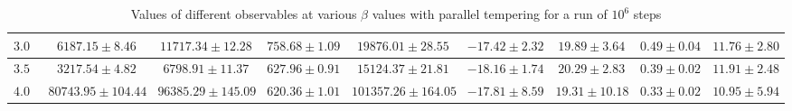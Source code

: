 \begin{sidewaystable}[t!]
\begin{tabular}{|c|c|c|c|c|c|c|c|c|}
            \hline
            $3.00$ & $6187.15 \pm 8.46$ & $11717.34 \pm 12.28$ & $758.68 \pm 1.09$ & $19876.01 \pm 28.55$ & $-17.42 \pm 2.32$ & $19.89 \pm 3.64$ & $0.49 \pm 0.04$ & $11.76 \pm 2.80$ \\
            \hline
            $3.50$ & $3217.54 \pm 4.82$ & $6798.91 \pm 11.37$ & $627.96 \pm 0.91$ & $15124.37 \pm 21.81$ & $-18.16 \pm 1.74$ & $20.29 \pm 2.83$ & $0.39 \pm 0.02$ & $11.91 \pm 2.48$ \\
            \hline
            $4.00$ & $80743.95 \pm 104.44$ & $96385.29 \pm 145.09$ & $620.36 \pm 1.01$ & $101357.26 \pm 164.05$ & $-17.81 \pm 8.59$ & $19.31 \pm 10.18$ & $0.33 \pm 0.02$ & $10.95 \pm 5.94$ \\            
        \end{tabular}
            \caption{Values of different observables at various $\beta$ values with parallel tempering for a run of $10 ^6$ steps}
        \label{mmc}
        \end{sidewaystable}